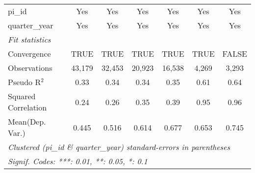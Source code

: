 \begin{tabular}{lcccccc}
   pi\_id                                                     & Yes          & Yes          & Yes           & Yes           & Yes           & Yes\\  
   quarter\_year                                              & Yes          & Yes          & Yes           & Yes           & Yes           & Yes\\  
   \midrule
   \emph{Fit statistics}\\
   Convergence                                                &TRUE          & TRUE         & TRUE          & TRUE          & TRUE          & FALSE\\  
   Observations                                               & 43,179       & 32,453       & 20,923        & 16,538        & 4,269         & 3,293\\  
   Pseudo R$^2$                                               & 0.33         & 0.34         & 0.34          & 0.35          & 0.61          & 0.64\\  
   Squared Correlation                                        & 0.24         & 0.26         & 0.35          & 0.39          & 0.95          & 0.96\\  
Mean(Dep. Var.) & 0.445 & 0.516 & 0.614 & 0.677 & 0.653 & 0.745 \\
   \midrule \midrule
   \multicolumn{7}{l}{\emph{Clustered (pi\_id \& quarter\_year) standard-errors in parentheses}}\\
   \multicolumn{7}{l}{\emph{Signif. Codes: ***: 0.01, **: 0.05, *: 0.1}}\\
\end{tabular}
\par\endgroup
